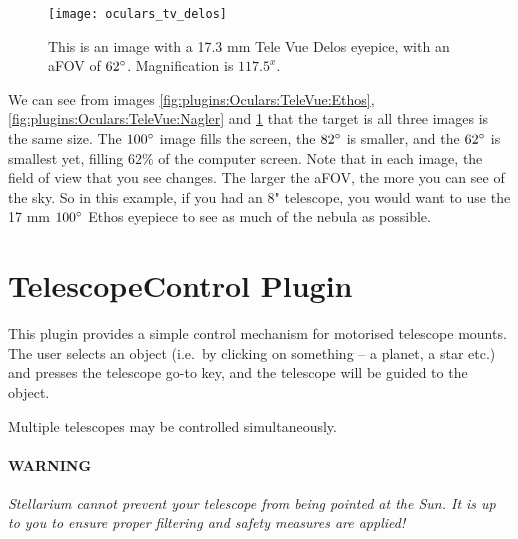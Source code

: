 \begin{figure}[ht]\centering
\texttt{[image: oculars\_tv\_delos]}
\caption{This is an image with a 17.3 mm Tele Vue Delos eyepice, with an aFOV of $62\degree$. Magnification is $117.5^x$.}
\label{fig:plugins:Oculars:TeleVue:Delos}
\end{figure}

We can see from images \ref{fig:plugins:Oculars:TeleVue:Ethos}, \ref{fig:plugins:Oculars:TeleVue:Nagler} and \ref{fig:plugins:Oculars:TeleVue:Delos} that the target is all three images is the same size. The $100\degree$ image fills the screen, the $82\degree$ is smaller, and the $62\degree$ is smallest yet, filling $62\%$ of the computer screen. Note that in each image, the field of view that you see changes. The larger the aFOV, the more you can see of the sky. So in this example, if you had an 8" telescope, you would want to use the 17 mm $100\degree$ Ethos eyepiece to see as much of the nebula as possible.

\newpage
\section{TelescopeControl Plugin}
\label{sec:plugins:TelescopeControl}

This plugin provides a simple control mechanism for motorised
telescope mounts. The user selects an object (i.e.\ by clicking on
something -- a planet, a star etc.) and presses the telescope go-to
key, and the telescope will be guided to the object.

Multiple telescopes may be controlled simultaneously. 

% 
% 

\paragraph{WARNING}\emph{Stellarium cannot prevent your
telescope from being pointed at the Sun. It is up to you to ensure
proper filtering and safety measures are applied!}

